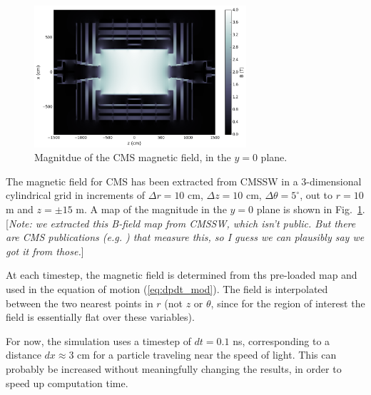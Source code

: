 \documentclass[12pt]{article}
\begin{document}
\begin{figure}
\centering
\includegraphics[width=0.7\textwidth]{plots/cms_bfield_coarse.png}
\caption{Magnitdue of the CMS magnetic field, in the $y=0$ plane.}
\label{fig:bfield}
\end{figure}

The magnetic field for CMS has been extracted from CMSSW
in a 3-dimensional cylindrical grid in increments of $\Delta r=10$ cm, $\Delta z=10$ cm, $\Delta\theta=5^\circ$, out to
$r=10$ m and $z=\pm15$ m. A map of the magnitude in the $y=0$ plane is shown in Fig.~\ref{fig:bfield}.
[\emph{Note: we extracted this B-field map from CMSSW, which isn't public. But there are CMS publications (e.g. \cite{CMS_bfield}) that measure
this, so I guess we can plausibly say we got it from those.}]

At each timestep, the magnetic field is determined from ths pre-loaded map and used in the equation of motion (\ref{eq:dpdt_mod}).
The field is interpolated between the two nearest points in $r$ (not $z$ or $\theta$, since for the region of interest the field
is essentially flat over these variables).

For now, the simulation uses a timestep of $dt=0.1$ ns, corresponding to a distance $dx\approx3$ cm for a particle traveling near
the speed of light. This can probably be increased without meaningfully changing the results, in order to speed up computation time.
\end{document}
